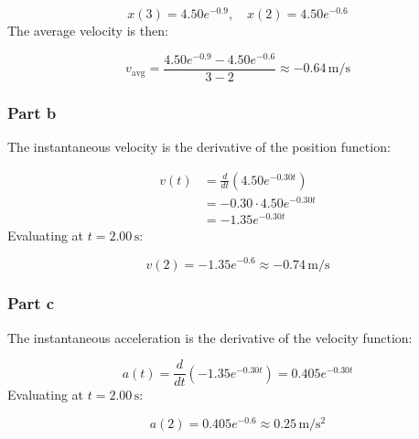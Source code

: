 \documentclass{article}
\newcommand{\meter}{\text{m}}
\newcommand{\second}{\text{s}}
\begin{document}
\[
x(3) = 4.50e^{-0.9}, \quad x(2) = 4.50e^{-0.6}
\]
The average velocity is then:

\[
v_{\text{avg}} = \frac{4.50e^{-0.9} - 4.50e^{-0.6}}{3 - 2} \approx -0.64 \, \si{\meter\per\second}
\]

\subsubsection*{Part b}
The instantaneous velocity is the derivative of the position function:

\begin{align*}
v(t) &= \frac{d}{dt} \left( 4.50e^{-0.30t} \right) \\
&= -0.30 \cdot 4.50e^{-0.30t} \\
&= -1.35e^{-0.30t}
\end{align*}
Evaluating at \( t = 2.00 \, \si{\second} \):

\[
v(2) = -1.35e^{-0.6} \approx -0.74 \, \si{\meter\per\second}
\]

\subsubsection*{Part c}
The instantaneous acceleration is the derivative of the velocity function:

\[
a(t) = \frac{d}{dt} \left( -1.35e^{-0.30t} \right) = 0.405e^{-0.30t}
\]
Evaluating at \( t = 2.00 \, \si{\second} \):

\[
a(2) = 0.405e^{-0.6} \approx 0.25 \, \si{\meter\per\second^2}
\]
\end{document}
